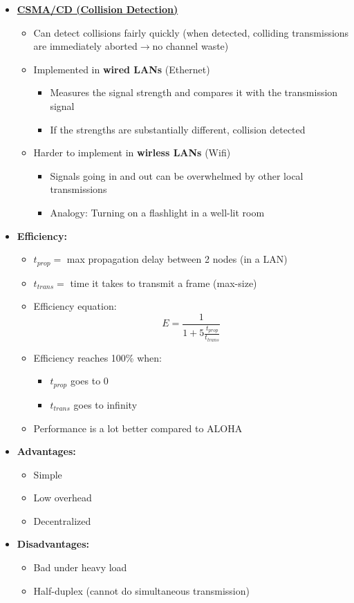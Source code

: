 \documentclass{article}
\begin{document}
\begin{itemize}
    \item \textbf{\underline{CSMA/CD (Collision Detection)}}
    \begin{itemize}
        \item Can detect collisions fairly quickly (when detected, colliding transmissions are
        immediately aborted$\rightarrow$no channel waste)
        \item Implemented in \textbf{wired LANs} (Ethernet)
        \begin{itemize}
            \item Measures the signal strength and compares it with the transmission signal
            \item If the strengths are substantially different, collision detected
        \end{itemize}
        \item Harder to implement in \textbf{wirless LANs} (Wifi)
        \begin{itemize}
            \item Signals going in and out can be overwhelmed by other local transmissions
            \item Analogy: Turning on a flashlight in a well-lit room
        \end{itemize}
    \end{itemize}
    \item \textbf{Efficiency:}
    \begin{itemize}
        \item $t_{prop}=$ max propagation delay between 2 nodes (in a LAN)
        \item $t_{trans}=$ time it takes to transmit a frame (max-size)
        \item Efficiency equation: \[E=\frac{1}{1+5\frac{t_{prop}}{t_{trans}}}\]
        \item Efficiency reaches 100\% when:
        \begin{itemize}
            \item $t_{prop}$ goes to 0
            \item $t_{trans}$ goes to infinity
        \end{itemize}
        \item Performance is a lot better compared to ALOHA
    \end{itemize}
    \item \textbf{Advantages:}
    \begin{itemize}
        \item Simple
        \item Low overhead
        \item Decentralized
    \end{itemize}
    \item \textbf{Disadvantages:}
    \begin{itemize}
        \item Bad under heavy load
        \item Half-duplex (cannot do simultaneous transmission)
    \end{itemize}


\end{itemize}
\end{document}
